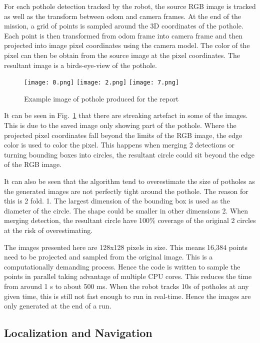 \documentclass[conference]{IEEEtran}
\begin{document}
For each pothole detection tracked by the robot, the source RGB image is tracked as well as the transform between odom and camera frames. At the end of the mission, a grid of points is sampled around the 3D coordinates of the pothole. Each point is then transformed from odom frame into camera frame and then projected into image pixel coordinates using the camera model. The color of the pixel can then be obtain from the source image at the pixel coordinates. The resultant image is a birds-eye-view of the pothole.

\begin{figure}[ht]
    \centering
    \texttt{[image: 0.png]}
    \texttt{[image: 2.png]}
    \texttt{[image: 7.png]}
    \caption{Example image of pothole produced for the report}
    \label{fig:pothole_image}
\end{figure}

It can be seen in Fig.~\ref{fig:pothole_image} that there are streaking artefact in some of the images. This is due to the saved image only showing part of the pothole. Where the projected pixel coordinates fall beyond the limits of the RGB image, the edge color is used to color the pixel. This happens when merging 2 detections or turning bounding boxes into circles, the resultant circle could sit beyond the edge of the RGB image.

It can also be seen that the algorithm tend to overestimate the size of potholes as the generated images are not perfectly tight around the pothole. The reason for this is 2 fold. 1. The largest dimension of the bounding box is used as the diameter of the circle. The shape could be smaller in other dimensions 2. When merging detection, the resultant circle have 100\% coverage of the original 2 circles at the risk of overestimating.

The images presented here are 128x128 pixels in size. This means 16,384 points need to be projected and sampled from the original image. This is a computationally demanding process. Hence the code is written to sample the points in parallel taking advantage of multiple CPU cores. This reduces the time from around 1 s to about 500 ms. When the robot tracks 10s of potholes at any given time, this is still not fast enough to run in real-time. Hence the images are only generated at the end of a run.

\subsection{Localization and Navigation}
\end{document}
